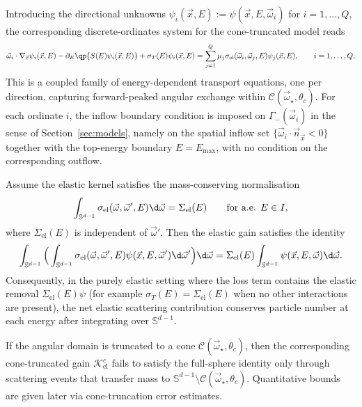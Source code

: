 \documentclass[final]{amsart}
\begin{document}
Introducing the directional unknowns
$\psi_i(\vec{x},E):=\psi(\vec{x},E,\vec{\omega}_i)$ for $i=1,\dots,Q$,
the corresponding discrete-ordinates system for the cone-truncated model reads
\begin{equation}
  \label{eq:DOM}
  \vec{\omega}_i\cdot\nabla_{\vec{x}}\psi_i(\vec{x},E)
  -
  \partial_E\qp{S(E)\psi_i(\vec{x},E)}
  +
  \sigma_T(E)\psi_i(\vec{x},E)
  =
  \sum_{j=1}^Q \mu_j 
  \sigma_{\text{el}}(\vec{\omega}_i,\vec{\omega}_j,E) 
  \psi_j(\vec{x},E),
  \qquad i=1,\dots,Q.
\end{equation}
This is a coupled family of energy-dependent transport equations, one
per direction, capturing forward-peaked angular exchange within
$\mathcal{C}(\vec{\omega}_\star,\theta_c)$. For each ordinate $i$, the
inflow boundary condition is imposed on $\Gamma_-(\vec\omega_i)$ in the
sense of Section~\ref{sec:models}, namely on the spatial inflow set
$\{\vec\omega_i\cdot \vec n_{\vec x}<0\}$ together with the top-energy
boundary $E=E_{\max}$, with no condition on the corresponding outflow.

\begin{remark}
Assume the elastic kernel satisfies the mass-conserving normalisation
\[
  \int_{\mathbb{S}^{d-1}} \sigma_{\text{el}}(\vec{\omega},\vec{\omega}',E) \d\vec{\omega}
  =
  \Sigma_{\text{el}}(E)
  \qquad \text{for a.e. } E\in I,
\]
where $\Sigma_{\text{el}}(E)$ is independent of $\vec{\omega}'$. Then the
elastic gain satisfies the identity
\[
  \int_{\mathbb{S}^{d-1}}
  \Big(\int_{\mathbb{S}^{d-1}}
  \sigma_{\text{el}}(\vec{\omega},\vec{\omega}',E) 
  \psi(\vec{x},E,\vec{\omega}') \d\vec{\omega}'\Big)\d\vec{\omega}
  =
  \Sigma_{\text{el}}(E)
  \int_{\mathbb{S}^{d-1}}
  \psi(\vec{x},E,\vec{\omega}) \d\vec{\omega}.
\]
Consequently, in the purely elastic setting where the loss term contains
the elastic removal $\Sigma_{\text{el}}(E)\psi$ (for example
$\sigma_T(E)=\Sigma_{\text{el}}(E)$ when no other interactions are
present), the net elastic scattering contribution conserves particle
number at each energy after integrating over $\mathbb{S}^{d-1}$.

If the angular domain is truncated to a cone
$\mathcal{C}(\vec{\omega}_\star,\theta_c)$, then the corresponding
cone-truncated gain $\mathcal{K}_{\mathrm{el}}^{c}$ fails to satisfy the
full-sphere identity only through scattering events that transfer mass to
$\mathbb{S}^{d-1}\setminus\mathcal{C}(\vec{\omega}_\star,\theta_c)$.
Quantitative bounds are given later via cone-truncation error estimates.
\end{remark}
\end{document}
